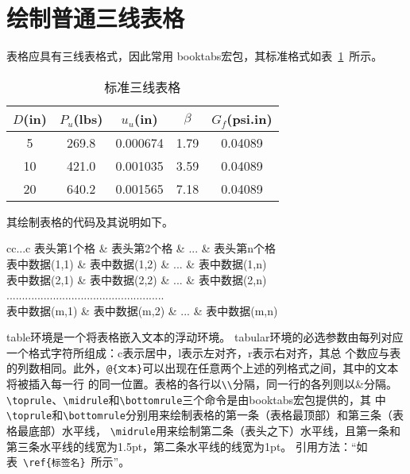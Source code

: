 \documentclass{article}
\begin{document}
    \section{绘制普通三线表格}
    表格应具有三线表格式，因此常用 booktabs宏包，其标准格式如表~\ref{tab001}~所示。
    \begin{table}[!htbp]
    \caption{标准三线表格}\label{tab001} \centering
    \begin{tabular}{ccccc}
    \toprule[1.5pt]
    $D$(in) & $P_u$(lbs) & $u_u$(in) & $\beta$ & $G_f$(psi.in)\\
    \midrule[1pt]
     5 & 269.8 & 0.000674 & 1.79 & 0.04089\\
    10 & 421.0 & 0.001035 & 3.59 & 0.04089\\
    20 & 640.2 & 0.001565 & 7.18 & 0.04089\\
    \bottomrule[1.5pt]
    \end{tabular}
    \end{table}
    
    其绘制表格的代码及其说明如下。
    \begin{tcode}
    \begin{table}[!htbp]
    \caption[标签名]{中文标题}
    \begin{tabular}{cc...c}
    \toprule[1.5pt]
    表头第1个格   & 表头第2个格   & ... & 表头第n个格  \\
    \midrule[1pt]
    表中数据(1,1) & 表中数据(1,2) & ... & 表中数据(1,n)\\
    表中数据(2,1) & 表中数据(2,2) & ... & 表中数据(2,n)\\
    ...................................................\\
    表中数据(m,1) & 表中数据(m,2) & ... & 表中数据(m,n)\\
    \bottomrule[1.5pt]
    \end{tabular}
    \end{table}
    \end{tcode}
    
    \bigskip
    table环境是一个将表格嵌入文本的浮动环境。
    tabular环境的必选参数由每列对应一个格式字符所组成：c表示居中，l表示左对齐，r表示右对齐，其总
    个数应与表的列数相同。此外，\verb|@{文本}|可以出现在任意两个上述的列格式之间，其中的文本将被插入每一行
    的同一位置。表格的各行以\verb|\\|分隔，同一行的各列则以\&分隔。
    \verb|\toprule|、\verb|\midrule|和\verb|\bottomrule|三个命令是由booktabs宏包提供的，其
    中\verb|\toprule|和\verb|\bottomrule|分别用来绘制表格的第一条（表格最顶部）和第三条（表格最底部）水平线，
    \verb|\midrule|用来绘制第二条（表头之下）水平线，且第一条和第三条水平线的线宽为1.5pt，第二条水平线的线宽为1pt。
    引用方法：“如表~\verb|\ref{标签名}|~所示”。
    
\end{document}
